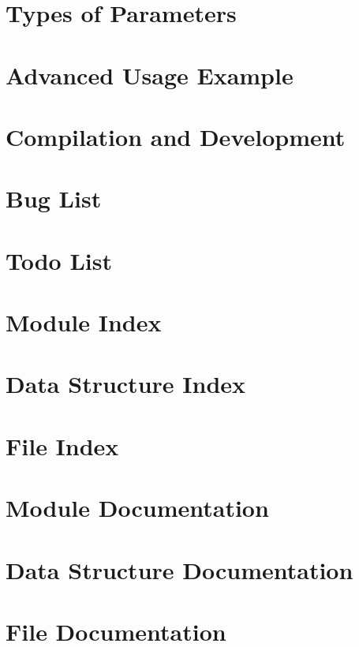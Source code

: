 \documentclass[a4paper]{article}
\begin{document}
\section{Types of Parameters}
\label{parameter_types}
\hypertarget{parameter_types}{}

\section{Advanced Usage Example}
\label{advanced_example}
\hypertarget{advanced_example}{}

\section{Compilation and Development}
\label{development}
\hypertarget{development}{}

\section{Bug List}
\label{bug}
\hypertarget{bug}{}

\section{Todo List}
\label{todo}
\hypertarget{todo}{}

\section{Module Index}

\section{Data Structure Index}

\section{File Index}

\section{Module Documentation}








\section{Data Structure Documentation}


\section{File Documentation}

\printindex
\end{document}
